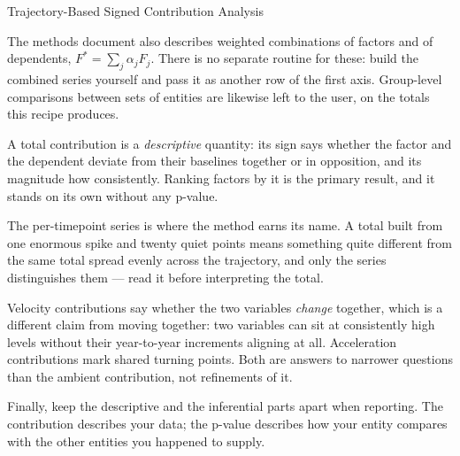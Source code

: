 \begin{recipe}[label=rec:trajectory-contributions]{Trajectory-Based Signed Contribution Analysis}
\begin{note}
  The methods document also describes weighted combinations of factors and of
  dependents, $F^{\ast} = \sum_j \alpha_j F_j$. There is no separate routine
  for these: build the combined series yourself and pass it as another row of
  the first axis. Group-level comparisons between sets of entities are likewise
  left to the user, on the totals this recipe produces.
\end{note}

\begin{interpretation}
  A total contribution is a \emph{descriptive} quantity: its sign says whether
  the factor and the dependent deviate from their baselines together or in
  opposition, and its magnitude how consistently. Ranking factors by it is the
  primary result, and it stands on its own without any p-value.

  The per-timepoint series is where the method earns its name. A total built
  from one enormous spike and twenty quiet points means something quite
  different from the same total spread evenly across the trajectory, and only
  the series distinguishes them --- read it before interpreting the total.

  Velocity contributions say whether the two variables \emph{change} together,
  which is a different claim from moving together: two variables can sit at
  consistently high levels without their year-to-year increments aligning at
  all. Acceleration contributions mark shared turning points. Both are
  answers to narrower questions than the ambient contribution, not refinements
  of it.

  Finally, keep the descriptive and the inferential parts apart when reporting.
  The contribution describes your data; the p-value describes how your entity
  compares with the other entities you happened to supply.
\end{interpretation}

\begin{references}
\end{references}

\end{recipe}
